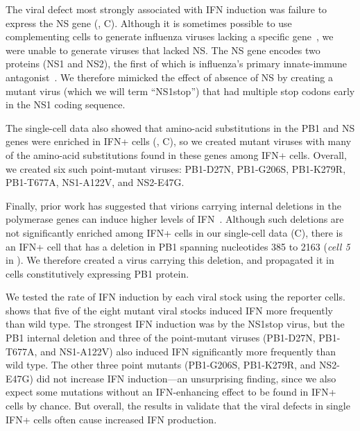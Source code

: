 \documentclass[9pt,lineno]{template}
\begin{document}
The viral defect most strongly associated with IFN induction was failure to express the NS gene (, C).
Although it is sometimes possible to use complementing cells to generate influenza viruses lacking a specific gene~\citep{fujii2003selective,marsh2007specific}, we were unable to generate viruses that lacked NS.
The NS gene encodes two proteins (NS1 and NS2), the first of which is influenza's primary innate-immune antagonist~\citep{garcia1998influenza, hale2008multifunctional}.
We therefore mimicked the effect of absence of NS by creating a mutant virus (which we will term ``NS1stop'') that had multiple stop codons early in the NS1 coding sequence.

The single-cell data also showed that amino-acid substitutions in the PB1 and NS genes were enriched in IFN+ cells (, C), so we created mutant viruses with many of the amino-acid substitutions found in these genes among IFN+ cells.
Overall, we created six such point-mutant viruses: PB1-D27N, PB1-G206S, PB1-K279R, PB1-T677A, NS1-A122V, and NS2-E47G.

Finally, prior work has suggested that virions carrying internal deletions in the polymerase genes can induce higher levels of IFN~\citep{baum2010preference, tapia2013defective, boergeling2015evidence, dimmock2015cloned}.
Although such deletions are not significantly enriched among IFN+ cells in our single-cell data (C), there is an IFN+ cell that has a deletion in PB1 spanning nucleotides 385 to 2163 (\textit{cell 5} in ).
We therefore created a virus carrying this deletion, and propagated it in cells constitutively expressing PB1 protein.

We tested the rate of IFN induction by each viral stock using the reporter cells.
 shows that five of the eight mutant viral stocks induced IFN more frequently than wild type.
The strongest IFN induction was by the NS1stop virus, but the PB1 internal deletion and three of the point-mutant viruses (PB1-D27N, PB1-T677A, and NS1-A122V) also induced IFN significantly more frequently than wild type.
The other three point mutants (PB1-G206S, PB1-K279R, and NS2-E47G) did not increase IFN induction---an unsurprising finding, since we also expect some mutations without an IFN-enhancing effect to be found in IFN+ cells by chance.
But overall, the results in  validate that the viral defects in single IFN+ cells often cause increased IFN production.
\end{document}
